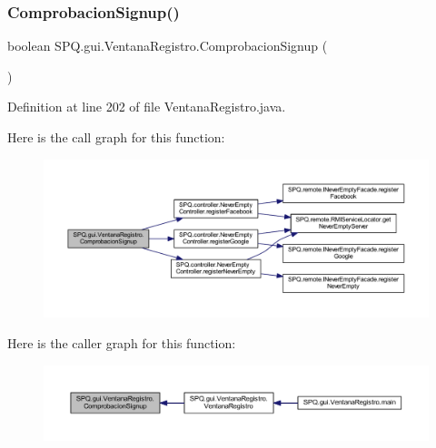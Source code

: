 \subsubsection{\texorpdfstring{Comprobacion\+Signup()}{ComprobacionSignup()}}
{\footnotesize\ttfamily boolean S\+P\+Q.\+gui.\+Ventana\+Registro.\+Comprobacion\+Signup (\begin{DoxyParamCaption}{ }\end{DoxyParamCaption})}



Definition at line 202 of file Ventana\+Registro.\+java.

Here is the call graph for this function\+:
\nopagebreak
\begin{figure}[H]
\begin{center}
\leavevmode
\includegraphics[width=350pt]{class_s_p_q_1_1gui_1_1_ventana_registro_a409053f213651ce392699ee8c4f07e66_cgraph}
\end{center}
\end{figure}
Here is the caller graph for this function\+:
\nopagebreak
\begin{figure}[H]
\begin{center}
\leavevmode
\includegraphics[width=350pt]{class_s_p_q_1_1gui_1_1_ventana_registro_a409053f213651ce392699ee8c4f07e66_icgraph}
\end{center}
\end{figure}
\mbox{\label{class_s_p_q_1_1gui_1_1_ventana_registro_ac33d30ad4e6980a453a3a6c3de20f468}} 
